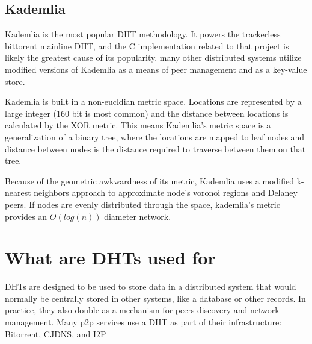 \subsection{Kademlia}

Kademlia is the most popular DHT methodology. 
It powers the trackerless bittorent mainline DHT, and the C implementation related to that project is likely the greatest cause of its popularity.
many other distributed systems utilize modified versions of Kademlia as a means of peer management and as a key-value store.

Kademlia is built in a non-eucldian metric space. 
Locations are represented by a large integer (160 bit is most common) and the distance between locations is calculated by the XOR metric.
This means Kademlia's metric space is a generalization of a binary tree, where the locations are mapped to leaf nodes and distance between nodes is the distance required to traverse between them on that tree.

Because of the geometric awkwardness of its metric, Kademlia uses a modified k-nearest neighbors approach to approximate node's voronoi regions and Delaney peers.
If nodes are evenly distributed through the space, kademlia's metric provides an $O(log(n))$ diameter network.


\section{What are DHTs used for}

DHTs are designed to be used to store data in a distributed system that would normally be centrally stored in other systems, like a database or other records.
In practice, they also double as a mechanism for peers discovery and network management.
Many p2p services use a DHT as part of their infrastructure: Bitorrent\cite{jimenez2011kademlia}, CJDNS\cite{hodson2013meshnet}, and I2P\cite{zantout2011i2p}
